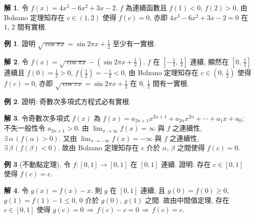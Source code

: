 \documentclass[12pt]{extarticle}
\newcommand{\ds}{\displaystyle}
\newcommand{\ie}{\,\Longrightarrow\,}
\theoremstyle{definition}
\newtheorem*{ex}{例}
\newtheorem*{sol}{解}
\begin{document}
\begin{sol}
  令 $f(x) = 4x^3 - 6x^2 + 3x - 2$. $f$ 為連續函數且 $f(1) < 0$, $f(2) > 0$, 由 Bolzano 定理知存在 $c\in(1, 2)$ 使得 $f(c) = 0$, 亦即 $4x^3 - 6x^2 + 3x - 2 = 0$ 在 $1$, $2$ 間有實根. 
\end{sol}

\begin{ex}
  證明 $\sqrt{\cos\pi x} = \sin 2\pi x + \frac{1}{2}$ 至少有一實根. 
\end{ex}

\begin{sol}
  令 $f(x) = \sqrt{\cos\pi x} - (\sin 2\pi x + \frac{1}{2})$. $f$ 在 $[-\frac{1}{2},\,\frac{1}{2}]$ 連續, 顯然在 $[0,\,\frac{1}{2}]$ 連續且 $f(0) = \frac{1}{2} > 0$, $f(\frac{1}{2}) = -\frac{1}{2} < 0$, 由 Bolzano 定理知存在 $c\in(0,\,\frac{1}{2})$ 使得 $f(c) = 0$, 亦即 $\sqrt{\cos\pi x} = \sin 2\pi x + \frac{1}{2}$ 在 $0$, $\frac{1}{2}$ 間有一實根. 
\end{sol}

\begin{ex}
  證明: 奇數次多項式方程式必有實根. 
\end{ex}

\begin{sol}
  令奇數次多項式 $f(x)$ 為 $\ds f(x) = a_{2n + 1}x^{2n + 1} + a_{2n}x^{2n} + \cdots + a_1 x + a_0$; 不失一般性令 $a_{2n + 1} > 0$. 由 $\ds\lim_{x\to\infty}f(x) = \infty$ 與 $f$ 之連續性, $\exists\,\alpha\,(f(\alpha) > 0)$. 又由 $\ds\lim_{x\to-\infty}f(x) = -\infty$ 與 $f$ 之連續性, $\exists\,\beta\,(f(\beta) < 0)$. 故由 Bolzano 定理知存在 $c$ 介於 $\alpha$, $\beta$ 之間使得 $f(c) = 0$.  
\end{sol}

%

\begin{ex}[不動點定理]
  令 $f:[0, 1]\to[0, 1]$ 在 $[0, 1]$ 連續. 證明: 存在 $c\in[0, 1]$ 使得 $\ds f(c) = c$. 
\end{ex}

\begin{sol}
  令 $g(x) = f(x) - x$. 則 $g$ 在 $[0, 1]$ 連續, 且 $g(0) = f(0)\geqslant 0$, $g(1) = f(1) - 1\leqslant 0$, $0$ 介於 $g(0)$, $g(1)$ 之間. 故由中間值定理, 存在 $c\in[0, 1]$ 使得 $\ds g(c) = 0 \ie f(c) - c = 0 \ie f(c) = c$. 
\end{sol}

%
%
\end{document}
